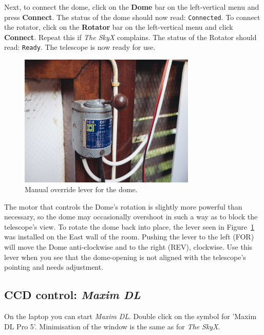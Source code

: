 \documentclass[12pt,twoside,a4paper]{report}
\begin{document}
Next, to connect the dome, click on the \textbf{Dome} bar on the left-vertical menu and press 
\textbf{Connect}. The status of the dome should now read: \textcolor{PineGreen}{\tt Connected}.
To connect the rotator, click on the \textbf{Rotator} bar on the left-vertical menu and 
click \textbf{Connect}. Repeat this if \emph{The SkyX} complains.  The status of the Rotator should 
read: \textcolor{PineGreen}{\tt Ready}. The telescope is now ready for use.\\

\begin{figure}[ht]
 \centering
    \includegraphics[width=0.75\textwidth]{documentation_images/dome_control.jpg}
    \caption{\label{fig:dome_control}Manual override lever for the dome.}
\end{figure}

The motor that controls the Dome's rotation is slightly more powerful than necessary, so the dome may occasionally overshoot in such a way as to block the telescope's view. To rotate the dome back into place, the lever seen in Figure~\ref{fig:dome_control} was installed on the East wall of the room. Pushing the lever to the left (FOR) will move the Dome anti-clockwise and to the right (REV), clockwise. Use this lever when you see that the dome-opening is not aligned with the telescope's pointing and needs adjustment.\\


\subsection{CCD control: \emph{Maxim DL}}

On the laptop you can start \emph{Maxim DL}. Double click on the symbol for 'Maxim DL Pro 5'. 
Minimisation of the window is the same as for \emph{The SkyX}.\\
\end{document}
